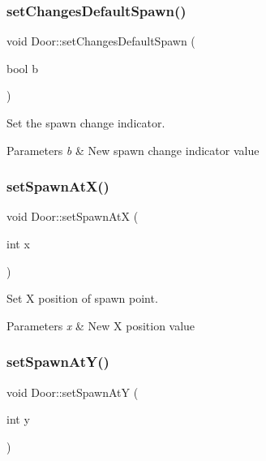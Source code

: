 \subsubsection{\texorpdfstring{set\+Changes\+Default\+Spawn()}{setChangesDefaultSpawn()}}
{\footnotesize\ttfamily void Door\+::set\+Changes\+Default\+Spawn (\begin{DoxyParamCaption}\item[{bool}]{b }\end{DoxyParamCaption})}



Set the spawn change indicator. 


\begin{DoxyParams}{Parameters}
{\em b} & New spawn change indicator value \\
\hline
\end{DoxyParams}
\mbox{\label{class_door_ab527eafbfd4fc67d5a17f20169ff9883}} 
\subsubsection{\texorpdfstring{set\+Spawn\+At\+X()}{setSpawnAtX()}}
{\footnotesize\ttfamily void Door\+::set\+Spawn\+AtX (\begin{DoxyParamCaption}\item[{int}]{x }\end{DoxyParamCaption})}



Set X position of spawn point. 


\begin{DoxyParams}{Parameters}
{\em x} & New X position value \\
\hline
\end{DoxyParams}
\mbox{\label{class_door_ac4aad24a6a7125c8e2cd136d4e70d0cf}} 
\subsubsection{\texorpdfstring{set\+Spawn\+At\+Y()}{setSpawnAtY()}}
{\footnotesize\ttfamily void Door\+::set\+Spawn\+AtY (\begin{DoxyParamCaption}\item[{int}]{y }\end{DoxyParamCaption})}



